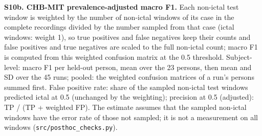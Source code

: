 \documentclass[11pt,a4paper]{article}
\begin{document}
\endgroup

\textbf{S10b. CHB-MIT prevalence-adjusted macro F1.} Each non-ictal test window is weighted by
the number of non-ictal windows of its case in the complete recordings divided by the
number sampled from that case (ictal windows: weight 1), so true
positives and false negatives keep their counts and false positives and true negatives
are scaled to the full non-ictal count; macro F1 is computed from this weighted
confusion matrix at the 0.5 threshold. Subject-level: macro F1 per held-out person, mean
over the 23 persons, then mean and SD over the 45 runs; pooled: the weighted confusion
matrices of a run's persons summed first. False positive rate: share of the sampled
non-ictal test windows predicted ictal at 0.5 (unchanged by the weighting); precision
at 0.5 (adjusted): TP / (TP + weighted FP). The estimate assumes that the sampled
non-ictal windows have the error rate of those not sampled; it is not a measurement on
all windows (\nolinkurl{src/posthoc_checks.py}).

\begingroup\footnotesize\setlength{\tabcolsep}{3pt}
\end{document}
